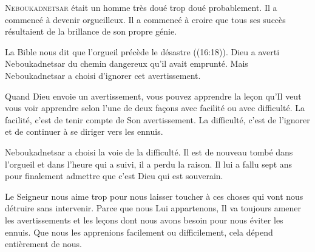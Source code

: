 \dvrule







\lettrine{N}{eboukadnetsar} était un homme très doué
 \ocadr trop doué probablement. Il a commencé à devenir orgueilleux.
 Il a commencé à croire que tous ses succès résultaient de la brillance
 de son propre génie. 

La Bible nous dit que \Og l'orgueil précède le désastre \Fg{}
 ((16:18)).
 Dieu a averti Neboukadnetsar du chemin dangereux qu'il avait emprunté.
 Mais Neboukadnetsar a choisi d'ignorer cet avertissement. 


Quand Dieu envoie un avertissement,
 vous pouvez apprendre la le\c{c}on
 qu'Il veut vous voir apprendre selon l'une de deux fa\c{c}ons\frcolon{}
 avec facilité ou avec difficulté. La facilité,
 c'est de tenir compte de Son avertissement. La difficulté,
 c'est de l'ignorer et de continuer à se diriger vers les ennuis. 

Neboukadnetsar a choisi la voie de la difficulté.
 Il est de nouveau tombé dans l'orgueil et dans l'heure qui a suivi,
 il a perdu la raison. Il lui a fallu sept ans pour finalement admettre
 que c'est Dieu qui est souverain. 

Le Seigneur nous aime trop pour nous laisser toucher à ces choses
 qui vont nous détruire sans intervenir. Parce que nous Lui appartenons,
 Il va toujours amener les avertissements et les le\c{c}ons
 dont nous avons besoin pour nous éviter les ennuis.
 Que nous les apprenions facilement ou difficilement,
 cela dépend entièrement de nous. 

